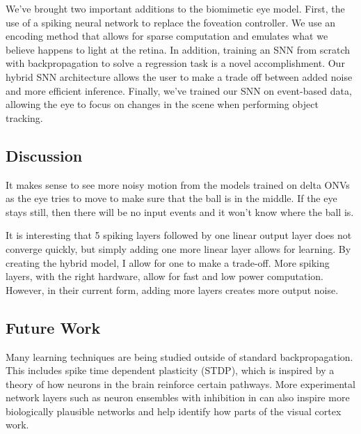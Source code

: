 \documentclass[../taasin.tex]{subfiles}
\begin{document}
We've brought two important additions to the biomimetic eye model. First, the use of a spiking neural network to replace the foveation controller. We use an encoding method that allows for sparse computation and emulates what we believe happens to light at the retina. In addition, training an SNN from scratch with backpropagation to solve a regression task is a novel accomplishment. Our hybrid SNN architecture allows the user to make a trade off between added noise and more efficient inference. Finally, we've trained our SNN on event-based data, allowing the eye to focus on changes in the scene when performing object tracking.


\subsection{Discussion}

It makes sense to see more noisy motion from the models trained on delta ONVs
as the eye tries to move to make sure that the ball is in the middle. If the eye stays
still, then there will be no input events and it won't know where the ball is.

It is interesting that 5 spiking layers followed by one linear output layer does not converge quickly, but simply 
adding one more linear layer allows for learning. By creating the hybrid model, I allow for one to make a trade-off. More spiking layers, with the right hardware, allow for fast and low power computation. However, in their current form, adding more layers creates more output noise.


\subsection{Future Work}


Many learning techniques are being studied outside of standard backpropagation. This includes spike time dependent plasticity (STDP), which is inspired by a theory of how neurons in the brain reinforce certain pathways. More experimental network layers such as neuron ensembles with inhibition in \cite{Nengo} can also inspire more biologically plausible networks and help identify how parts of the visual cortex work.
\end{document}
